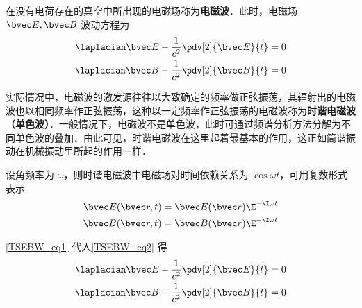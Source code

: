 在没有电荷存在的真空中所出现的电磁场称为\textbf{电磁波}．此时，电磁场 $\bvec E,\bvec B$ 波动方程为
\begin{equation}\label{TSEBW_eq2}
\begin{aligned}
\laplacian\bvec E-\frac{1}{c^2}\pdv[2]{\bvec E}{t}=0\\
\laplacian\bvec B-\frac{1}{c^2}\pdv[2]{\bvec B}{t}=0
\end{aligned}
\end{equation}

实际情况中，电磁波的激发源往往以大致确定的频率做正弦振荡，其辐射出的电磁波也以相同频率作正弦振荡，这种以一定频率作正弦振荡的电磁波称为\textbf{时谐电磁波（单色波）}．一般情况下，电磁波不是单色波，此时可通过频谱分析方法分解为不同单色波的叠加．由此可见，时谐电磁波在这里起着最基本的作用，这正如简谐振动在机械振动里所起的作用一样．

设角频率为 $\omega$，则时谐电磁波中电磁场对时间依赖关系为 $\cos\omega t$，可用复数形式表示
\begin{equation}\label{TSEBW_eq1}
\begin{aligned}
\bvec E(\bvec r,t)=\bvec E(\bvec r)\E^{-\I\omega t}\\
\bvec B(\bvec r,t)=\bvec B(\bvec r)\E^{-\I\omega t}
\end{aligned}
\end{equation}

\autoref{TSEBW_eq1} 代入\autoref{TSEBW_eq2} 得
\begin{equation}
\begin{aligned}
\laplacian\bvec E-\frac{1}{c^2}\pdv[2]{\bvec E}{t}=0\\
\laplacian\bvec B-\frac{1}{c^2}\pdv[2]{\bvec B}{t}=0
\end{aligned}
\end{equation}
